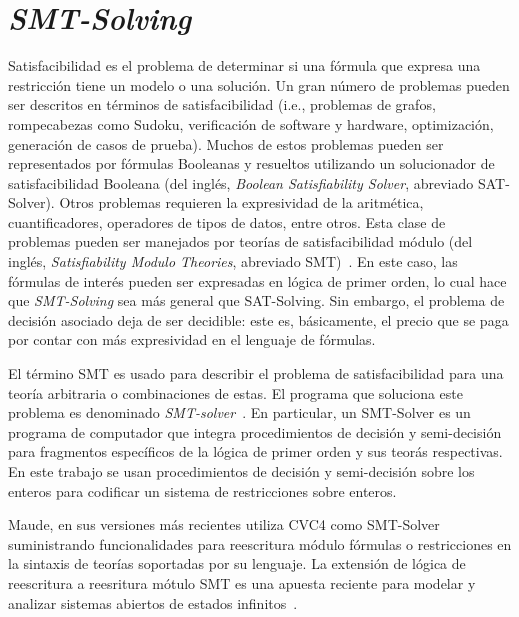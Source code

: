 \section{\textit{SMT-Solving}}
\label{smt.prelim}

Satisfacibilidad es el problema de determinar si una f\'ormula que expresa una 
restricci\'on tiene un modelo o una soluci\'on. Un gran n\'umero de problemas 
pueden ser descritos en t\'erminos de satisfacibilidad (i.e., problemas de 
grafos, rompecabezas como Sudoku, verificaci\'on de software y hardware, 
optimizaci\'on, generaci\'on de casos de prueba). Muchos de estos 
problemas pueden ser representados por f\'ormulas Booleanas y resueltos 
utilizando un solucionador de satisfacibilidad Booleana (del ingl\'es, \textit{Boolean 
Satisfiability Solver}, abreviado SAT-Solver). Otros problemas requieren 
la expresividad de la aritm\'etica, cuantificadores, operadores de tipos de 
datos, entre otros. Esta clase de problemas pueden ser manejados por 
teor\'ias de satisfacibilidad m\'odulo (del ingl\'es, \textit{Satisfiability 
Modulo Theories}, abreviado SMT)~\cite{deMoura2007}. En este caso, las 
f\'ormulas de inter\'es pueden ser expresadas en l\'ogica de primer orden, lo 
cual hace que \textit{SMT-Solving} sea m\'as general que SAT-Solving. Sin 
embargo, el problema de decisi\'on asociado deja de ser decidible: este es, 
b\'asicamente, el precio que se paga por contar con m\'as expresividad en el 
lenguaje de f\'ormulas.

El t\'ermino SMT es usado para describir el problema de satisfacibilidad 
para una teor\'ia arbitraria o combinaciones de estas. El programa que 
soluciona este problema es denominado \textit{SMT-solver}~\cite{Kroening:2008:DPA:1391237}. 
En particular, un SMT-Solver es un programa de computador que integra 
procedimientos de decisi\'on y semi-decisi\'on para fragmentos espec\'ificos 
de la l\'ogica de primer orden y sus teor\'as respectivas. En este trabajo se 
usan procedimientos de decisi\'on y semi-decisi\'on sobre los enteros para 
codificar un sistema de restricciones sobre enteros.

Maude, en sus versiones m\'as recientes utiliza CVC4 como SMT-Solver 
suministrando funcionalidades para reescritura m\'odulo f\'ormulas o 
restricciones en la sintaxis de teor\'ias soportadas por su lenguaje. 
La extensi\'on de l\'ogica de reescritura a reesritura m\'otulo SMT es una 
apuesta reciente para modelar y analizar sistemas abiertos de estados 
infinitos~\cite{Rocha2017269}.


